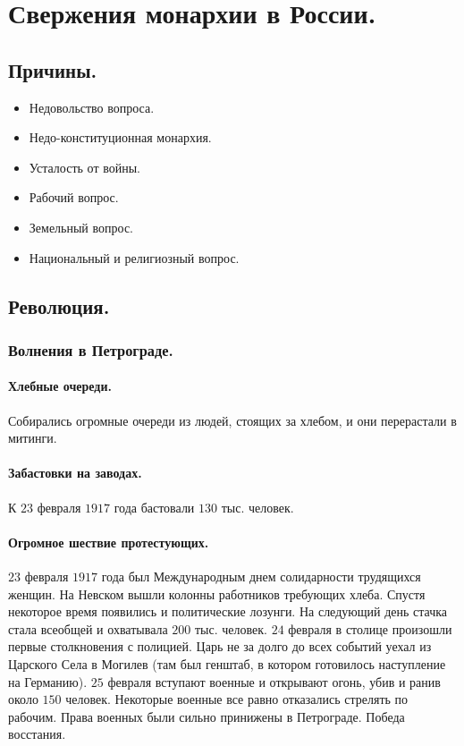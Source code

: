 \documentclass[12pt]{article}
\begin{document}
	\section{Свержения монархии в России.}
	\subsection{Причины.}
	\begin{itemize}
		\item Недовольство вопроса.
		\item Недо-конституционная монархия.
		\item Усталость от войны.
		\item Рабочий вопрос.
		\item Земельный вопрос.
		\item Национальный и религиозный вопрос.
	\end{itemize}
	\subsection{Революция.}
	\subsubsection{Волнения в Петрограде.}
	\paragraph{Хлебные очереди.} Собирались огромные очереди из людей, стоящих за хлебом, и они перерастали в митинги.
	\paragraph{Забастовки на заводах.} К $23$ февраля $1917$ года бастовали $130$ тыс. человек.
	\paragraph{Огромное шествие протестующих.} $23$ февраля $1917$ года был Международным днем солидарности трудящихся женщин. На Невском вышли колонны работников требующих хлеба. Спустя некоторое время появились и политические лозунги. На следующий день стачка стала всеобщей и охватывала $200$ тыс. человек. $24$ февраля в столице произошли первые столкновения с полицией. Царь не за долго до всех событий уехал из Царского Села в Могилев (там был генштаб, в котором готовилось наступление на Германию). $25$ февраля вступают военные и открывают огонь, убив и ранив около $150$ человек. Некоторые военные все равно отказались стрелять по рабочим. Права военных были сильно принижены в Петрограде. Победа восстания.
\end{document}
